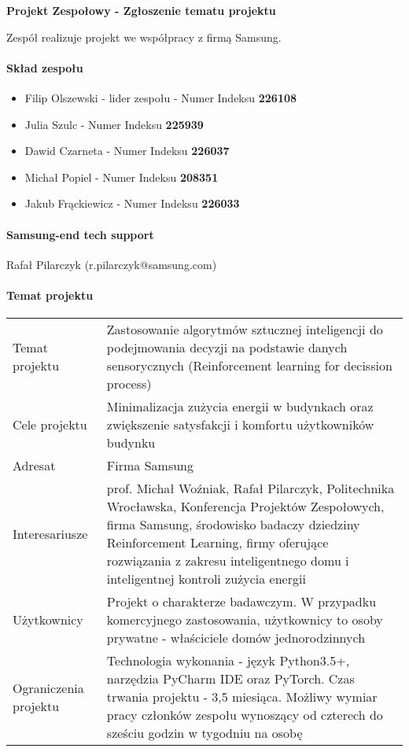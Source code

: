 \documentclass{article}
\begin{document}
\begin{center}
\textbf{Projekt Zespołowy - Zgłoszenie tematu projektu}
\end{center}

Zespół realizuje projekt we współpracy z firmą Samsung.

\paragraph{Skład zespołu}
\begin{itemize}
\item Filip Olszewski - lider zespołu - Numer Indeksu \textbf{226108}
\item Julia Szulc - Numer Indeksu \textbf{225939}
\item Dawid Czarneta - Numer Indeksu \textbf{226037}
\item Michał Popiel - Numer Indeksu \textbf{208351}
\item Jakub Frąckiewicz - Numer Indeksu \textbf{226033}
\end{itemize}
\paragraph{Samsung-end tech support}
Rafał Pilarczyk (r.pilarczyk@samsung.com)
\paragraph{Temat projektu}

\begin{center}
{\def\arraystretch{1.7}\tabcolsep=6pt
	\begin{tabular}{l p{10cm}} 
	Temat projektu& Zastosowanie algorytmów sztucznej inteligencji do podejmowania decyzji na podstawie danych sensorycznych (Reinforcement learning for decission process)\\
	Cele projektu& Minimalizacja zużycia energii w budynkach oraz zwiększenie satysfakcji i komfortu użytkowników budynku \\
	Adresat& Firma Samsung\\
	Interesariusze& prof. Michał Woźniak, Rafał Pilarczyk, Politechnika Wrocławska, Konferencja Projektów Zespołowych, firma Samsung, środowisko badaczy dziedziny Reinforcement Learning, firmy oferujące rozwiązania z zakresu inteligentnego domu i inteligentnej kontroli zużycia energii\\
	Użytkownicy& Projekt o charakterze badawczym. W przypadku komercyjnego zastosowania, użytkownicy to osoby prywatne - właściciele domów jednorodzinnych\\
	Ograniczenia projektu&Technologia wykonania - język Python3.5+, narzędzia PyCharm IDE oraz PyTorch. Czas trwania projektu - 3,5 miesiąca. Możliwy wymiar pracy członków zespołu wynoszący od czterech do sześciu godzin w tygodniu na osobę\\

\end{tabular}}
\end{center}
\end{document}

